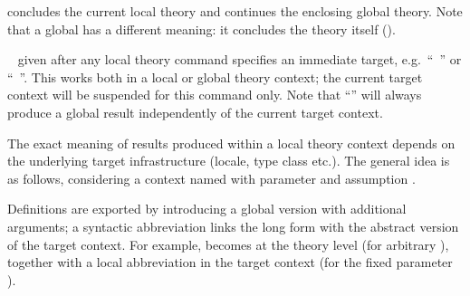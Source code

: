 \begin{isabellebody}
\begin{isamarkuptext}
\begin{description}
  \item \hyperlink{command.local.end}{\mbox{}} concludes the current local theory
  and continues the enclosing global theory.  Note that a global
  \hyperlink{command.global.end}{\mbox{}} has a different meaning: it concludes the
  theory itself ().
  
  \item \isa{{\isachardoublequote}{\isacharparenleft}{\isachardoublequote}}\hypertarget{keyword.in}{\hyperlink{keyword.in}{\mbox{}}}~ given after any
  local theory command specifies an immediate target, e.g.\
  ``\hyperlink{command.definition}{\mbox{}}~'' or ``\hyperlink{command.theorem}{\mbox{}}~''.  This works both in a local or
  global theory context; the current target context will be suspended
  for this command only.  Note that ``\isa{{\isachardoublequote}{\isacharparenleft}{\isasymIN}\ {\isacharminus}{\isacharparenright}{\isachardoublequote}}'' will
  always produce a global result independently of the current target
  context.

  \end{description}

  The exact meaning of results produced within a local theory context
  depends on the underlying target infrastructure (locale, type class
  etc.).  The general idea is as follows, considering a context named
  \isa{c} with parameter \isa{x} and assumption .
  
  Definitions are exported by introducing a global version with
  additional arguments; a syntactic abbreviation links the long form
  with the abstract version of the target context.  For example,
   becomes  at the theory
  level (for arbitrary \isa{{\isachardoublequote}{\isacharquery}x{\isachardoublequote}}), together with a local
  abbreviation \isa{{\isachardoublequote}c\ {\isasymequiv}\ c{\isachardot}a\ x{\isachardoublequote}} in the target context (for the
  fixed parameter \isa{x}).


\end{isamarkuptext}
\end{isabellebody}
